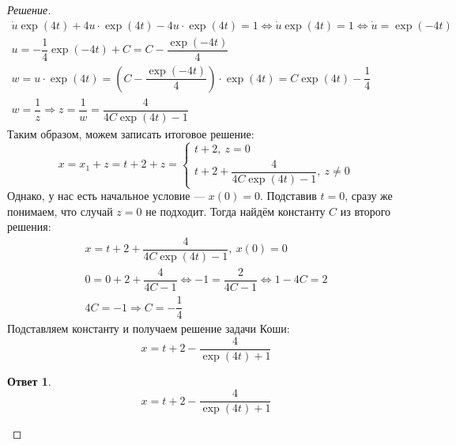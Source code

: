 \documentclass[a4paper,12pt]{article}
\newtheorem*{ans}{Ответ}
\newcommand{\du}{\dot{u}}
\newcommand{\bto}{\Longrightarrow}
\begin{document}
\begin{proof}[Решение]
\begin{gather*}
	\du\exp(4t) + 4u\cdot \exp(4t) -  4u\cdot \exp(4t) = 1 \iff \du\exp(4t) = 1 \iff \du = \exp(-4t)\\
	u = -\dfrac{1}{4}\exp(-4t) + C = C - \dfrac{\exp(-4t)}{4}\\
	w = u \cdot \exp(4t) = \left(C - \dfrac{\exp(-4t)}{4}\right) \cdot \exp(4t) = C\exp(4t) - \dfrac{1}{4}\\
	w = \dfrac{1}{z} \bto  z = \dfrac{1}{w} = \dfrac{4}{4C\exp(4t) - 1}
	\end{gather*}
	Таким образом, можем записать итоговое решение:
	\[x = x_1 + z = t + 2 + z = \begin{cases}
	t + 2,\ z = 0\\
	t + 2 + \dfrac{4}{4C\exp(4t) - 1},\ z \neq 0
	\end{cases}\]
	Однако, у нас есть начальное условие --- $x(0) = 0$. Подставив $t = 0$, сразу же понимаем, что случай $z = 0$ не подходит. Тогда найдём константу $C$ из второго решения:
	\begin{gather*}
	x = t + 2 + \dfrac{4}{4C\exp(4t) - 1},\ x(0) = 0\\
	0 = 0 + 2 + \dfrac{4}{4C - 1}\iff -1 = \dfrac{2}{4C - 1} \iff 1 - 4C = 2\\
	4C = -1 \bto C = -\dfrac{1}{4}
	\end{gather*}
	Подставляем константу и получаем решение задачи Коши:
	\[x = t + 2 - \dfrac{4}{\exp(4t) + 1}\]
	\begin{ans}
		\[x = t + 2 - \dfrac{4}{\exp(4t) + 1}\]
	\end{ans}
\end{proof}
\end{document}

